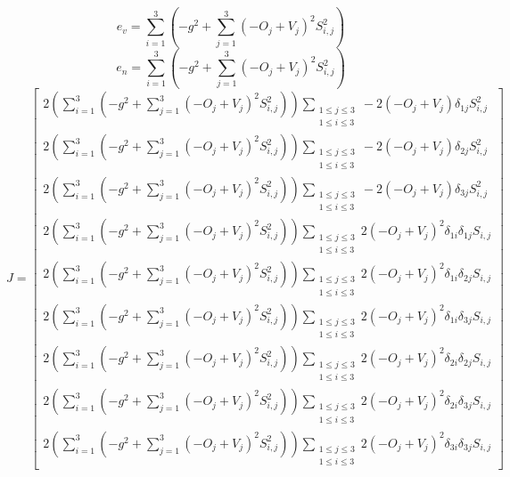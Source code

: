 $$
 \mathtt{\text{ }}
$$
$$
e_v= \sum_{i=1}^{3} \left(- g^{2} + \sum_{j=1}^{3} \left(- {O}_{j} + {V}_{j}\right)^{2} {S}_{i,j}^{2}\right)
$$$$
e_n= \sum_{i=1}^{3} \left(- g^{2} + \sum_{j=1}^{3} \left(- {O}_{j} + {V}_{j}\right)^{2} {S}_{i,j}^{2}\right)
$$$$
J= \left[\begin{matrix}2 \left(\sum_{i=1}^{3} \left(- g^{2} + \sum_{j=1}^{3} \left(- {O}_{j} + {V}_{j}\right)^{2} {S}_{i,j}^{2}\right)\right) \sum_{\substack{1 \leq j \leq 3\\1 \leq i \leq 3}} - 2 \left(- {O}_{j} + {V}_{j}\right) \delta_{1 j} {S}_{i,j}^{2}\\2 \left(\sum_{i=1}^{3} \left(- g^{2} + \sum_{j=1}^{3} \left(- {O}_{j} + {V}_{j}\right)^{2} {S}_{i,j}^{2}\right)\right) \sum_{\substack{1 \leq j \leq 3\\1 \leq i \leq 3}} - 2 \left(- {O}_{j} + {V}_{j}\right) \delta_{2 j} {S}_{i,j}^{2}\\2 \left(\sum_{i=1}^{3} \left(- g^{2} + \sum_{j=1}^{3} \left(- {O}_{j} + {V}_{j}\right)^{2} {S}_{i,j}^{2}\right)\right) \sum_{\substack{1 \leq j \leq 3\\1 \leq i \leq 3}} - 2 \left(- {O}_{j} + {V}_{j}\right) \delta_{3 j} {S}_{i,j}^{2}\\2 \left(\sum_{i=1}^{3} \left(- g^{2} + \sum_{j=1}^{3} \left(- {O}_{j} + {V}_{j}\right)^{2} {S}_{i,j}^{2}\right)\right) \sum_{\substack{1 \leq j \leq 3\\1 \leq i \leq 3}} 2 \left(- {O}_{j} + {V}_{j}\right)^{2} \delta_{1 i} \delta_{1 j} {S}_{i,j}\\2 \left(\sum_{i=1}^{3} \left(- g^{2} + \sum_{j=1}^{3} \left(- {O}_{j} + {V}_{j}\right)^{2} {S}_{i,j}^{2}\right)\right) \sum_{\substack{1 \leq j \leq 3\\1 \leq i \leq 3}} 2 \left(- {O}_{j} + {V}_{j}\right)^{2} \delta_{1 i} \delta_{2 j} {S}_{i,j}\\2 \left(\sum_{i=1}^{3} \left(- g^{2} + \sum_{j=1}^{3} \left(- {O}_{j} + {V}_{j}\right)^{2} {S}_{i,j}^{2}\right)\right) \sum_{\substack{1 \leq j \leq 3\\1 \leq i \leq 3}} 2 \left(- {O}_{j} + {V}_{j}\right)^{2} \delta_{1 i} \delta_{3 j} {S}_{i,j}\\2 \left(\sum_{i=1}^{3} \left(- g^{2} + \sum_{j=1}^{3} \left(- {O}_{j} + {V}_{j}\right)^{2} {S}_{i,j}^{2}\right)\right) \sum_{\substack{1 \leq j \leq 3\\1 \leq i \leq 3}} 2 \left(- {O}_{j} + {V}_{j}\right)^{2} \delta_{2 i} \delta_{2 j} {S}_{i,j}\\2 \left(\sum_{i=1}^{3} \left(- g^{2} + \sum_{j=1}^{3} \left(- {O}_{j} + {V}_{j}\right)^{2} {S}_{i,j}^{2}\right)\right) \sum_{\substack{1 \leq j \leq 3\\1 \leq i \leq 3}} 2 \left(- {O}_{j} + {V}_{j}\right)^{2} \delta_{2 i} \delta_{3 j} {S}_{i,j}\\2 \left(\sum_{i=1}^{3} \left(- g^{2} + \sum_{j=1}^{3} \left(- {O}_{j} + {V}_{j}\right)^{2} {S}_{i,j}^{2}\right)\right) \sum_{\substack{1 \leq j \leq 3\\1 \leq i \leq 3}} 2 \left(- {O}_{j} + {V}_{j}\right)^{2} \delta_{3 i} \delta_{3 j} {S}_{i,j}\end{matrix}\right]
$$